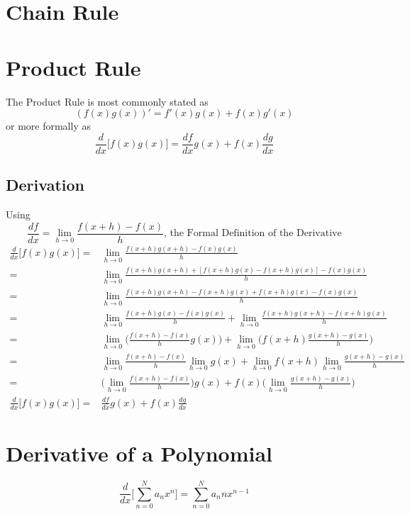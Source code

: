 \section{Chain Rule}

\section{Product Rule}
The Product Rule is most commonly stated as
\[(f(x)g(x))' = f'(x)g(x) + f(x)g'(x)\]
or more formally as
\[\frac{d}{dx}\bigg[f(x)g(x) \bigg] = \frac{df}{dx}g(x) + f(x)\frac{dg}{dx} \]

\subsection{Derivation}
Using
\[\frac{df}{dx} = \lim_{h\to0}\frac{f(x+h) -f(x)}{h} \text{, the Formal Definition of the Derivative}\]
\begin{align*}
\frac{d}{dx}\bigg[f(x)g(x) \bigg] =& \lim_{h\to0}\frac{f(x+h)g(x+h) -f(x)g(x)}{h} \\
=& \lim_{h\to0}\frac{f(x+h)g(x+h) + [f(x+h)g(x) - f(x+h)g(x)] - f(x)g(x)}{h} \\
=& \lim_{h\to0}\frac{f(x+h)g(x+h) - f(x+h)g(x) + f(x+h)g(x) - f(x)g(x)}{h} \\
=& \lim_{h\to0}\frac{f(x+h)g(x) - f(x)g(x)}{h} + \lim_{h\to0}\frac{f(x+h)g(x+h) - f(x+h)g(x)}{h} \\
=& \lim_{h\to0}\bigg(\frac{f(x+h) - f(x)}{h}g(x)\bigg) + \lim_{h\to0}\bigg(f(x+h)\frac{g(x+h) - g(x)}{h}\bigg) \\
=& \lim_{h\to0}\frac{f(x+h) - f(x)}{h}\lim_{h\to0}g(x) + \lim_{h\to0}f(x+h)\lim_{h\to0}\frac{g(x+h) - g(x)}{h} \\
=& \bigg(\lim_{h\to0}\frac{f(x+h) - f(x)}{h}\bigg)g(x) + f(x)\bigg(\lim_{h\to0}\frac{g(x+h) - g(x)}{h}\bigg) \\
\frac{d}{dx}\bigg[f(x)g(x) \bigg] =& \frac{df}{dx}g(x) + f(x)\frac{dg}{dx}
\end{align*}

\section{Derivative of a Polynomial}
\[ \frac{d}{dx}\bigg[\sum\limits_{n=0}^N{a_n x^n} \bigg] = \sum\limits_{n=0}^N{a_n n x^{n-1}}\]

